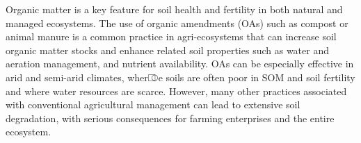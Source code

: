 Organic matter is a key feature for soil health and fertility in both natural and managed ecosystems. The use of organic amendments (OAs) such as compost or animal manure is a common practice in agri-ecosystems that can increase soil organic matter stocks and enhance related soil properties such as  water and aeration management, and nutrient availability. OAs can be especially effective in arid and semi-arid climates, wher⎄e soils are often poor in SOM and soil fertility and where water resources are scarce. However, many other practices associated with conventional agricultural management can lead to extensive soil degradation, with serious consequences for farming enterprises and the entire ecosystem.        
        